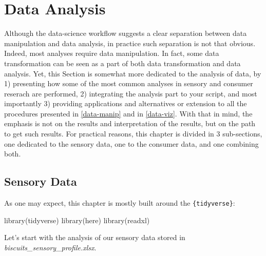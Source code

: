 \documentclass[
]{krantz}
\makeatletter
\newenvironment{Shaded}{\begin{snugshade}}{\end{snugshade}}
\newcommand{\FunctionTok}[1]{\textcolor[rgb]{0,0,0}{#1}}
\newcommand{\NormalTok}[1]{#1}
\renewenvironment{quote}{\begin{VF}}{\end{VF}}
\newenvironment{kframe}{%
\medskip{}
\setlength{\fboxsep}{.8em}
 \def\at@end@of@kframe{}%
 \ifinner\ifhmode%
  \def\at@end@of@kframe{\end{minipage}}%
  \begin{minipage}{\columnwidth}%
 \fi\fi%
 \def\FrameCommand##1{\hskip\@totalleftmargin \hskip-\fboxsep
 \colorbox{shadecolor}{##1}\hskip-\fboxsep
     \hskip-\linewidth \hskip-\@totalleftmargin \hskip\columnwidth}%
 \MakeFramed {\advance\hsize-\width
   \@totalleftmargin\z@ \linewidth\hsize
   \@setminipage}}%
 {\par\unskip\endMakeFramed%
 \at@end@of@kframe}
\renewenvironment{Shaded}{\begin{kframe}}{\end{kframe}}
\makeatother
\begin{document}
\hypertarget{data-analysis}{%
\chapter{Data Analysis}\label{data-analysis}}

\begin{quote}
Although the data-science workflow suggests a clear separation between data manipulation and data analysis, in practice such separation is not that obvious. Indeed, most analyses require data manipulation. In fact, some data transformation can be seen as a part of both data transformation and data analysis. Yet, this Section is somewhat more dedicated to the analysis of data, by 1) presenting how some of the most common analyses in sensory and consumer reserach are performed, 2) integrating the analysis part to your script, and most importantly 3) providing applications and alternatives or extension to all the procedures presented in \ref{data-manip} and in \ref{data-viz}. With that in mind, the emphasis is not on the results and interpretation of the results, but on the path to get such results.
For practical reasons, this chapter is divided in 3 sub-sections, one dedicated to the sensory data, one to the consumer data, and one combining both.
\end{quote}

\hypertarget{sensory-analysis}{%
\section{Sensory Data}\label{sensory-analysis}}

As one may expect, this chapter is mostly built around the \texttt{\{tidyverse\}}:

\begin{Shaded}
\begin{Highlighting}[]
\FunctionTok{library}\NormalTok{(tidyverse)}
\FunctionTok{library}\NormalTok{(here)}
\FunctionTok{library}\NormalTok{(readxl)}
\end{Highlighting}
\end{Shaded}

Let's start with the analysis of our sensory data stored in \emph{biscuits\_sensory\_profile.xlsx}.
\end{document}
